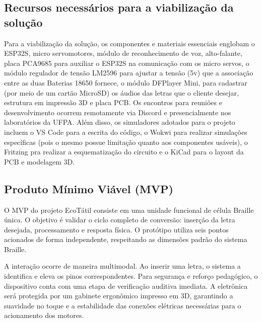 \documentclass[12pt, a4paper]{article}
\begin{document}
\subsection{Recursos necessários para a viabilização da solução}
Para a viabilização da solução, os componentes e materiais essenciais englobam o ESP32S, micro servomotores, módulo de reconhecimento de voz, alto-falante, placa PCA9685 para auxiliar o ESP32S na comunicação com os micro servos, o módulo regulador de tensão LM2596 para ajustar a tensão (5v) que a associação entre as duas Baterias 18650 fornece, o módulo DFPlayer Mini, para cadastrar (por meio de um cartão MicroSD) os áudios das letras que o cliente desejar,  estrutura em impressão 3D e placa PCB. Os encontros para reuniões e desenvolvimento ocorrem remotamente via Discord e presencialmente nos laboratórios da UFPA. Além disso, os simuladores adotados para o projeto incluem o VS Code para a escrita do código, o Wokwi para realizar simulações específicas (pois o mesmo
possue limitação quanto aos componentes usáveis), o Fritzing pra realizar a esquematização do circuito e o KiCad para o layout da PCB e modelagem 3D.

\subsection{Produto Mínimo Viável (MVP)}
O MVP do projeto EcoTátil consiste em uma unidade funcional de célula Braille única. O objetivo é validar o ciclo completo de conversão: inserção da letra desejada, processamento e resposta física. O protótipo utiliza seis pontos acionados de forma independente, respeitando as dimensões padrão do sistema Braille.

A interação ocorre de maneira multimodal. Ao inserir uma letra, o sistema a identifica e eleva os pinos correspondentes. Para segurança e reforço pedagógico, o dispositivo conta com uma etapa de verificação auditiva imediata. A eletrônica será protegida por um gabinete ergonômico impresso em 3D, garantindo a suavidade no toque e a estabilidade das conexões elétricas necessárias para o acionamento dos motores.
\end{document}
